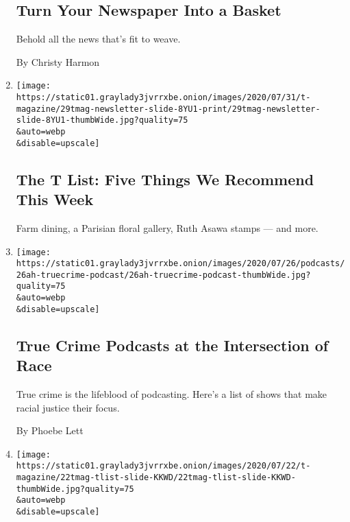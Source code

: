 \begin{enumerate}
  \hypertarget{turn-your-newspaper-into-a-basket}{%
  \subsection{Turn Your Newspaper Into a
  Basket}\label{turn-your-newspaper-into-a-basket}}

  Behold all the news that's fit to weave.

  By Christy Harmon
\item
  \href{/2020/07/30/t-magazine/the-t-list-five-things-we-recommend-this-week.html}{}

  \texttt{[image: https://static01.graylady3jvrrxbe.onion/images/2020/07/31/t-magazine/29tmag-newsletter-slide-8YU1-print/29tmag-newsletter-slide-8YU1-thumbWide.jpg?quality=75\\\&auto=webp\\\&disable=upscale]}

  \hypertarget{the-t-list-five-things-we-recommend-this-week-3}{%
  \subsection{The T List: Five Things We Recommend This
  Week}\label{the-t-list-five-things-we-recommend-this-week-3}}

  Farm dining, a Parisian floral gallery, Ruth Asawa stamps --- and
  more.
\item
  \href{/2020/07/25/at-home/coronavirus-true-crime-podcasts-race.html}{}

  \texttt{[image: https://static01.graylady3jvrrxbe.onion/images/2020/07/26/podcasts/26ah-truecrime-podcast/26ah-truecrime-podcast-thumbWide.jpg?quality=75\\\&auto=webp\\\&disable=upscale]}

  \hypertarget{true-crime-podcasts-at-the-intersection-of-race}{%
  \subsection{True Crime Podcasts at the Intersection of
  Race}\label{true-crime-podcasts-at-the-intersection-of-race}}

  True crime is the lifeblood of podcasting. Here's a list of shows that
  make racial justice their focus.

  By Phoebe Lett
\item
  \href{/2020/07/23/t-magazine/puzzles-bug-spray-tlist.html}{}

  \texttt{[image: https://static01.graylady3jvrrxbe.onion/images/2020/07/22/t-magazine/22tmag-tlist-slide-KKWD/22tmag-tlist-slide-KKWD-thumbWide.jpg?quality=75\\\&auto=webp\\\&disable=upscale]}


\end{enumerate}
